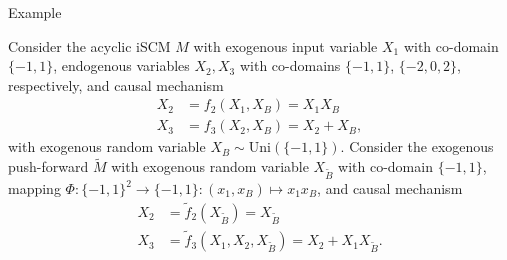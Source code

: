 \begin{frame}{Example}
\begin{Eg}[\ref{eg:exogenous_pushforward_not_counterfactually_equivalent}]
Consider the acyclic iSCM $M$ with exogenous input variable $X_1$ with co-domain $\{-1,1\}$, endogenous variables $X_2,X_3$ with co-domains $\{-1,1\}$, $\{-2,0,2\}$, respectively, and causal mechanism
  $$\begin{aligned} 
    X_2 &= f_2(X_1,X_B) = X_1 X_B \\
    X_3 &= f_3(X_2,X_B) = X_2 + X_B,
  \end{aligned}$$
with exogenous random variable $X_B \sim \mathrm{Uni}(\{-1,1\})$.
Consider the exogenous push-forward $\tilde{M}$ with exogenous random variable $X_{\tilde{B}}$ with co-domain $\{-1,1\}$, mapping $\Phi : \{-1,1\}^2 \to \{-1,1\} : (x_1,x_B) \mapsto x_1 x_B$, and causal mechanism
  $$\begin{aligned} 
    X_2 &= \tilde{f}_2(X_{\tilde{B}}) = X_{\tilde{B}} \\
    X_3 &= \tilde{f}_3(X_1, X_2, X_{\tilde{B}}) = X_2 + X_1 X_{\tilde{B}}.
  \end{aligned}$$ 
\end{Eg}
\end{frame}

